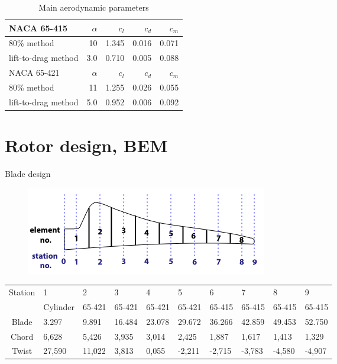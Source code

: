 \documentclass[12pt,t]{beamer}
\begin{document}
\begin{frame}
\footnotesize
\begin{table}[H]
\begin{tabular}{l | r r r r}
NACA 65-415 & $\alpha$ &$c_l$ &$c_d$ & $c_m$\\
\hline
80\% method& 10 & 1.345 & 0.016 & 0.071\\
lift-to-drag method & 3.0 & 0.710 & 0.005 &  0.088\\
\hline
NACA 65-421 & $\alpha$ &$c_l$ &$c_d$ & $c_m$\\
\hline
80\% method& 11 & 1.255 & 0.026 & 0.055\\
lift-to-drag method & 5.0 & 0.952 & 0.006 &  0.092\\
\end{tabular}
\caption{Main aerodynamic parameters}
\end{table}
\end{frame}


\section{Rotor design, BEM}

\begin{frame}
\huge
Blade design
\Tiny
\begin{figure}[H]
\includegraphics[width=0.6\linewidth]{../CIP_2/Figures/blade_elements.png}
\label{fig:blade_elemets}
\end{figure}
\begin{table}[H]
\begin{tabular}{c| l l l l l l l l l}
\hline
Station  & 	1&	2&	3	&4	&5	&6	&7	&8	&9\\
&Cylinder&65-421&65-421&65-421&65-421& 65-415& 65-415& 65-415&65-415\\
\hline
Blade&	3.297&	9.891&	16.484&	23.078&	29.672&	36.266&	42.859&	49.453&	52.750\\
\hline
Chord &	6,628	&5,426&	3,935	&3,014&	2,425&	1,887&	1,617&	1,413&	1,329\\
Twist &	27,590&	11,022&	3,813&	0,055&	-2,211&	-2,715&	-3,783&	-4,580&	-4,907\\
\hline
\end{tabular}
\label{final_blade_design_schmitz}
\end{table}
\end{frame}
\end{document}
